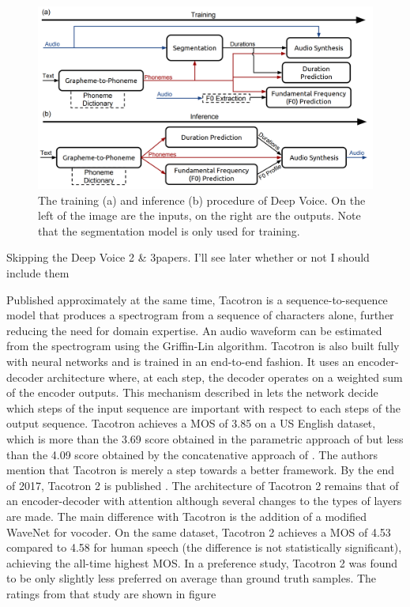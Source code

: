 \documentclass[a4paper, oneside, 12pt, english]{article}
\begin{document}
\begin{figure}[h]
	\centering
	\includegraphics[width=.8\linewidth]{images/deep_voice_1_arch.png}
	\caption{The training (a) and inference (b) procedure of Deep Voice. On the left of the image are the inputs, on the right are the outputs. Note that the segmentation model is only used for training.}
	\label{deep_voice_1_arch}
\end{figure}


\color{red}
Skipping the Deep Voice 2 \& 3papers. I'll see later whether or not I should include them
\color{black}

Published approximately at the same time, Tacotron \citep{Tacotron1} is a sequence-to-sequence model that produces a spectrogram from a sequence of characters alone, further reducing the need for domain expertise. An audio waveform can be estimated from the spectrogram using the Griffin-Lin algorithm. Tacotron is also built fully with neural networks and is trained in an end-to-end fashion. It uses an encoder-decoder architecture where, at each step, the decoder operates on a weighted sum of the encoder outputs. This mechanism described in \citep{Attention} lets the network decide which steps of the input sequence are important with respect to each steps of the output sequence. Tacotron achieves a MOS of 3.85 on a US English dataset, which is more than the 3.69 score obtained in the parametric approach of \citep{LSTM-RNN} but less than the 4.09 score obtained by the concatenative approach of \citep{ConcatenativeGoogle}. The authors mention that Tacotron is merely a step towards a better framework. By the end of 2017, Tacotron 2 is published \citep{Tacotron2}. The architecture of Tacotron 2 remains that of an encoder-decoder with attention although several changes to the types of layers are made. The main difference with Tacotron is the addition of a modified WaveNet for vocoder. On the same dataset, Tacotron 2 achieves a MOS of 4.53 compared to 4.58 for human speech (the difference is not statistically significant), achieving the all-time highest MOS. In a preference study, Tacotron 2 was found to be only slightly less preferred on average than ground truth samples. The ratings from that study are shown in figure 
\end{document}
